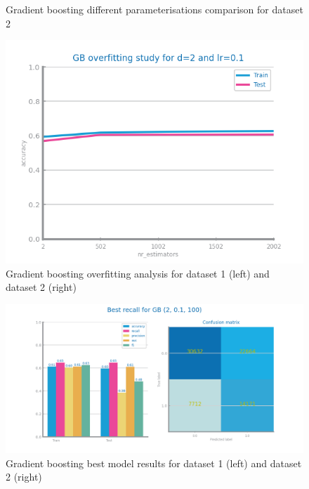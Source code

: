 \documentclass[10pt]{extarticle}
\begin{document}
\begin{figure}[H]
\caption{Gradient boosting different parameterisations comparison for dataset 2}
\end{figure}

\begin{figure}[H]
\centering\includegraphics[scale=0.95]{images/dataset1/models_evaluation/CovidPos_gb_accuracy_overfitting.png}
\caption{Gradient boosting overfitting analysis for dataset 1 (left) and dataset 2 (right)}
\end{figure}

\begin{figure}[H]
\centering\includegraphics[scale=0.95]{images/dataset1/models_evaluation/CovidPos_gb_GB_best_recall_eval.png}
\caption{Gradient boosting best model results for dataset 1 (left) and dataset 2 (right)}
\end{figure}
\end{document}
